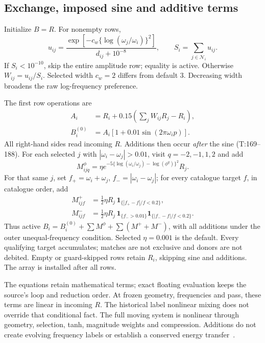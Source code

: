 \documentclass[11pt,a4paper]{article}
\newcommand{\src}[2]{\textsf{#1:#2}}
\begin{document}
\subsection{Exchange, imposed sine and additive terms}
Initialize \(B=R\). For nonempty rows,
\begin{equation}\label{eq:TW}
u_{ij}=\frac{\exp[-c_w\{\log(\omega_j/\omega_i)\}^2]}{d_{ij}+10^{-8}},
\qquad S_i=\sum_{j\in\mathcal N_i}u_{ij}.
\end{equation}
If \(S_i<10^{-10}\), skip the entire amplitude row; equality is active. Otherwise \(W_{ij}=u_{ij}/S_i\). Selected width \(c_w=2\) differs from default 3. Decreasing width broadens the raw log-frequency preference.

The first row operations are
\begin{align}
A_i&=R_i+0.15\left(\sum_jW_{ij}R_j-R_i\right),\\
B_i^{(0)}&=A_i[1+0.01\sin(2\pi\omega_i p)].\label{eq:Tsine}
\end{align}
All right-hand sides read incoming \(R\). Additions then occur \emph{after} the sine (\src{T}{169--188}). For each selected \(j\) with \(|\omega_i-\omega_j|>0.01\), visit \(q=-2,-1,1,2\) and add
\begin{equation}\label{eq:phi}
M^\phi_{ijq}=\eta e^{-5\{\log(\omega_i/\omega_j)-\log(\phi^q)\}^2}R_j .
\end{equation}
For that same \(j\), set \(f_+=\omega_i+\omega_j\), \(f_-=|\omega_i-\omega_j|\); for every catalogue target \(f\), in catalogue order, add
\begin{align}
M^+_{ijf}&=\tfrac12\eta R_j\,\mathbf1_{\{|f_+-f|/f<0.2\}},\\
M^-_{ijf}&=\tfrac12\eta R_j\,\mathbf1_{\{f_->0.01\}}
                             \mathbf1_{\{|f_--f|/f<0.2\}}.\label{eq:sumdiff}
\end{align}
Thus active \(B_i=B_i^{(0)}+\sum M^\phi+\sum(M^++M^-)\), with all additions under the outer unequal-frequency condition. Selected \(\eta=0.001\) is the default. Every qualifying target accumulates; matches are not exclusive and donors are not debited. Empty or guard-skipped rows retain \(R_i\), skipping sine and additions. The array is installed after all rows.

The equations retain mathematical terms; exact floating evaluation keeps the source's loop and reduction order. At frozen geometry, frequencies and pass, these terms are linear in incoming \(R\). The historical label nonlinear mixing does not override that conditional fact. The full moving system is nonlinear through geometry, selection, tanh, magnitude weights and compression. Additions do not create evolving frequency labels or establish a conserved energy transfer~\citep{s6review,s6study}.
\end{document}

